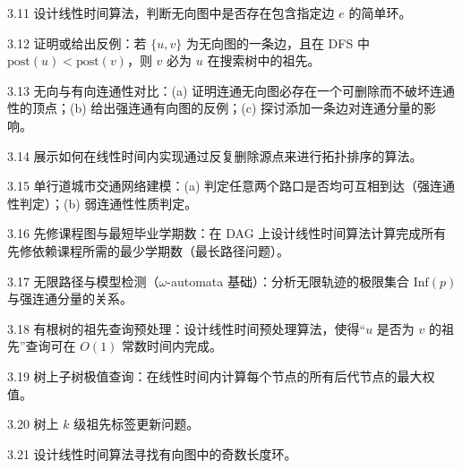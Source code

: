 \begin{exercise}{3.11}
设计线性时间算法，判断无向图中是否存在包含指定边 $e$ 的简单环。
\end{exercise}

\begin{exercise}{3.12}
证明或给出反例：若 $\{u, v\}$ 为无向图的一条边，且在 DFS 中 $\text{post}(u) < \text{post}(v)$，则 $v$ 必为 $u$ 在搜索树中的祖先。
\end{exercise}

\begin{exercise}{3.13}
无向与有向连通性对比：(a) 证明连通无向图必存在一个可删除而不破坏连通性的顶点；(b) 给出强连通有向图的反例；(c) 探讨添加一条边对连通分量的影响。
\end{exercise}

\begin{exercise}{3.14}
展示如何在线性时间内实现通过反复删除源点来进行拓扑排序的算法。
\end{exercise}

\begin{exercise}{3.15}
单行道城市交通网络建模：(a) 判定任意两个路口是否均可互相到达（强连通性判定）；(b) 弱连通性性质判定。
\end{exercise}

\begin{exercise}{3.16}
先修课程图与最短毕业学期数：在 DAG 上设计线性时间算法计算完成所有先修依赖课程所需的最少学期数（最长路径问题）。
\end{exercise}

\begin{exercise}{3.17}
无限路径与模型检测（$\omega$-automata 基础）：分析无限轨迹的极限集合 $\text{Inf}(p)$ 与强连通分量的关系。
\end{exercise}

\begin{exercise}{3.18}
有根树的祖先查询预处理：设计线性时间预处理算法，使得“$u$ 是否为 $v$ 的祖先”查询可在 $O(1)$ 常数时间内完成。
\end{exercise}

\begin{exercise}{3.19}
树上子树极值查询：在线性时间内计算每个节点的所有后代节点的最大权值。
\end{exercise}

\begin{exercise}{3.20}
树上 $k$ 级祖先标签更新问题。
\end{exercise}

\begin{exercise}{3.21}
设计线性时间算法寻找有向图中的奇数长度环。
\end{exercise}

